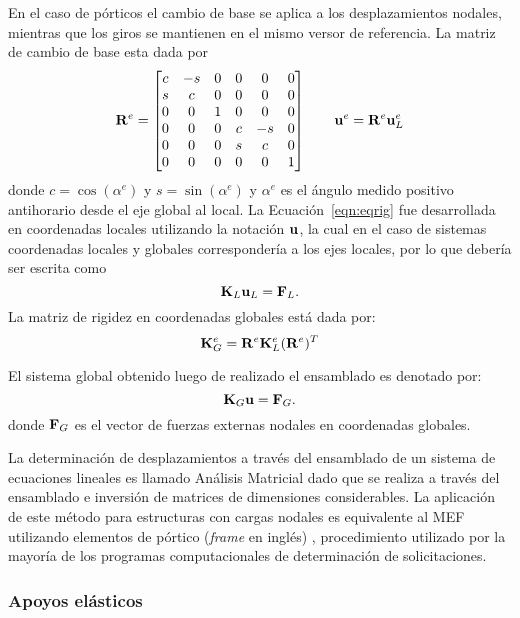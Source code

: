 En el caso de pórticos el cambio de base se aplica a los desplazamientos nodales, mientras que los giros se mantienen en el mismo versor de referencia. %
%
La matriz de cambio de base esta dada por
%
\begin{equation}
	{\bf R}^e = 
	\left[
	\begin{matrix}
		c & -s & 0 & 0 &  0 & 0 \\
		s & c & 0 & 0 &  0 & 0\\
		0 & 0 &1 & 0 &  0 & 0\\
		0 & 0 &0  &   c & -s& 0\\
		0 & 0 &0  &  s & c & 0\\
		0 & 0 &0 & 0 &  0 & 1\\
	\end{matrix}
	\right]
	\qquad
	{\bf u}^e = {\bf R}^e {\bf u}^e_L
\end{equation}
%
donde $c=\cos(\alpha^e)$ y $s=\sin(\alpha^e)$ y $\alpha^e$ es el ángulo medido positivo antihorario desde el eje global al local. %
%
La Ecuación~\eqref{eqn:eqrig} fue desarrollada en coordenadas locales utilizando la notación ${\bf u}$, la cual en el caso de sistemas coordenadas locales y globales correspondería a los ejes locales, por lo que debería ser escrita como
\begin{equation}
	{\bf K}_L {\bf u}_L = {\bf F}_L.
\end{equation}
%
La matriz de rigidez en coordenadas globales está dada por:
\begin{equation}
	{\bf K}^e_G = {\bf R}^e {\bf K}^e_L ({\bf R}^e)^T
\end{equation}

%
El sistema global obtenido luego de realizado el ensamblado es denotado por:
\begin{equation}
	{\bf K}_G {\bf u} = {\bf F}_G.
\end{equation}
donde ${\bf F}_G$ es el vector de fuerzas externas nodales en coordenadas globales.

La determinación de desplazamientos a través del ensamblado de un sistema de ecuaciones lineales es llamado Análisis Matricial dado que se realiza a través del ensamblado e inversión de matrices de dimensiones considerables. %
%
La aplicación de este método para estructuras con cargas nodales es equivalente al MEF utilizando elementos de pórtico (\textit{frame} en inglés) \citep{Onate2013}, procedimiento utilizado por la mayoría de los programas computacionales de determinación de solicitaciones.



\subsubsection{Apoyos elásticos}

